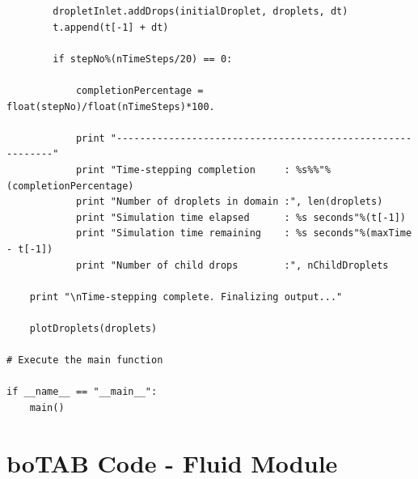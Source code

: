 \documentclass[12pt]{article}
\begin{document}
\begin{lstlisting}
        dropletInlet.addDrops(initialDroplet, droplets, dt)
        t.append(t[-1] + dt)

        if stepNo%(nTimeSteps/20) == 0:

            completionPercentage = float(stepNo)/float(nTimeSteps)*100.

            print "-----------------------------------------------------------"
            print "Time-stepping completion     : %s%%"%(completionPercentage)
            print "Number of droplets in domain :", len(droplets)
            print "Simulation time elapsed      : %s seconds"%(t[-1])
            print "Simulation time remaining    : %s seconds"%(maxTime - t[-1])
            print "Number of child drops        :", nChildDroplets

    print "\nTime-stepping complete. Finalizing output..."

    plotDroplets(droplets)

# Execute the main function

if __name__ == "__main__":
    main()
\end{lstlisting}
\newpage
\section{boTAB Code - Fluid Module}
\end{document}
